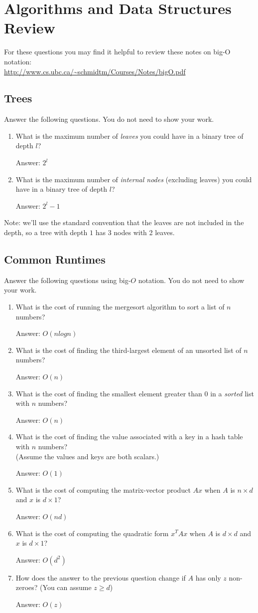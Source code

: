\documentclass{article}
\def\ans#1{\par\gre{Answer: #1}}
\def\blu#1{{\color{blu}#1}}
\def\gre#1{{\color{gre}#1}}
\begin{document}
\clearpage

\section{Algorithms and Data Structures Review}

For these questions you may find it helpful to review these notes on big-O notation:\\
\url{http://www.cs.ubc.ca/~schmidtm/Courses/Notes/bigO.pdf}

\subsection{Trees}

\blu{Answer the following questions.} You do not need to show your work.
\begin{enumerate}
\item What is the maximum number of \emph{leaves} you could have in a binary tree of depth $l$?
\ans{$2^l$}
\item What is the maximum number of \emph{internal nodes} (excluding leaves) you could have in a binary tree of depth $l$?
\ans{$2^l-1$}
\end{enumerate}
Note: we'll use the standard convention that the leaves are not included in the depth, so a tree with depth $1$ has 3 nodes with 2 leaves.

\clearpage

\subsection{Common Runtimes}

\blu{Answer the following questions using big-$O$ notation.} You do not need to show your work.
\begin{enumerate}
\item What is the cost of running the mergesort algorithm to sort  a list of $n$ numbers?
\ans{$O(nlogn)$}
\item What is the cost of finding the third-largest element of an unsorted list of $n$ numbers?
\ans{$O(n)$}
\item What is the cost of finding the smallest element greater than 0 in a \emph{sorted} list with $n$ numbers?
\ans{$O(n)$}
\item What is the cost of finding the value associated with a key in a hash table with $n$ numbers? \\(Assume the values and keys are both scalars.)
\ans{$O(1)$}
\item What is the cost of computing the matrix-vector product $Ax$ when $A$ is $n \times d$ and $x$ is $d \times 1$?
\ans{$O(nd)$}
\item What is the cost of computing the quadratic form $x^TAx$ when $A$ is $d \times d$ and $x$ is $d \times 1$?
\ans{$O(d^2)$}
\item How does the answer to the previous question change if $A$ has only $z$ non-zeroes? (You can assume $z \geq d$)
\ans{$O(z)$}
\end{enumerate}
\end{document}
